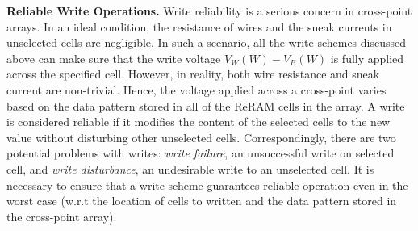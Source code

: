 \vspace{5pt}\noindent\textbf{Reliable Write Operations.} 
Write reliability is a serious concern in cross-point arrays. In an ideal
condition, the resistance of wires and the sneak currents in unselected
cells are negligible. In such a scenario, all the write schemes discussed
above can make sure that the write voltage $V_W(W)-V_B(W)$ is fully
applied across the specified cell. However, in reality, both wire
resistance and sneak current are non-trivial. Hence, the voltage applied
across a cross-point varies based on the data pattern stored in all of the
ReRAM cells in the array. A write is considered reliable if it modifies
the content of the selected cells to the new value without disturbing
other unselected cells.
Correspondingly, there are two potential problems with writes: \emph{write
failure}, an unsuccessful write on selected cell, and \emph{write
disturbance}, an undesirable write to an unselected cell. It is necessary to ensure that a write scheme guarantees reliable operation even in the worst case (w.r.t the location of cells to written and the data pattern stored in the cross-point array).

